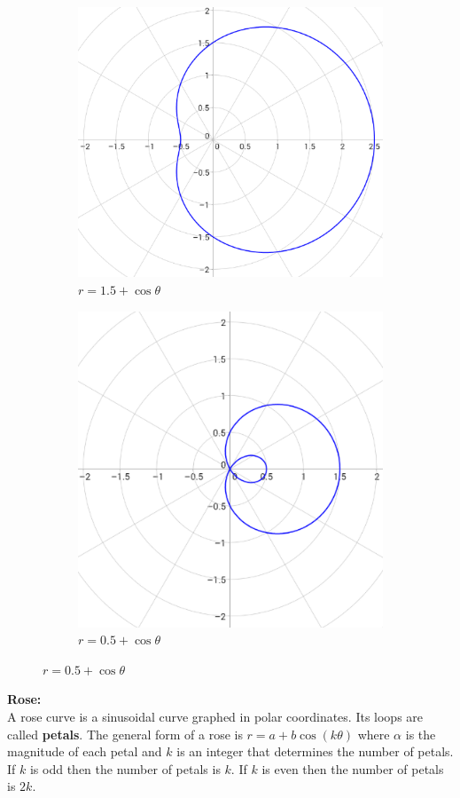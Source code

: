         \begin{figure} [hbt!]
            \centering
            \begin{subfigure}{.5\textwidth}
                \includegraphics[width=.4\linewidth]{Resources/Unit3Vectors/limacon1.PNG}
                \caption*{$r=1.5+\cos\theta$}
            \end{subfigure}
            \begin{subfigure}{.5\textwidth}
                \includegraphics[width=.4\linewidth]{Resources/Unit3Vectors/limacon2.PNG}
                \caption*{$r=0.5+\cos\theta$}
            \end{subfigure}
        \end{figure}

        \noindent \textbf{Rose:} \\
        A rose curve is a sinusoidal curve graphed in polar coordinates. Its loops are called
        \textbf{petals}. The general form of a rose is $r=a+b\cos(k\theta)$ where $\alpha$ is
        the magnitude of each petal and $k$ is an integer that determines the number of petals.
        If $k$ is odd then the number of petals is $k$. If $k$ is even then the number of petals
        is $2k$. \\

